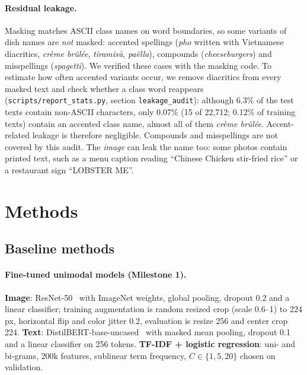 \documentclass[11pt,a4paper]{article}
\begin{document}
\paragraph{Residual leakage.}
Masking matches ASCII class names on word boundaries, so some variants of dish names are \emph{not} masked:
accented spellings (\emph{pho} written with Vietnamese diacritics, \emph{cr\`eme br\^ul\'ee}, \emph{tiramis\`u},
\emph{pa\"ella}), compounds (\emph{cheeseburgers}) and misspellings (\emph{spagetti}). We verified these cases with
the masking code. To estimate how often accented variants occur, we remove diacritics from every masked text and
check whether a class word reappears (\texttt{scripts/report\_stats.py}, section \texttt{leakage\_audit}): although
6.3\% of the test texts contain non-ASCII characters, only 0.07\% (15 of 22,712; 0.12\% of training texts) contain an
accented class name, almost all of them \emph{cr\`eme br\^ul\'ee}. Accent-related leakage is therefore negligible.
Compounds and misspellings are not covered by this audit. The \emph{image} can leak the name too: some photos contain printed text, such as a menu caption
reading ``Chinese Chicken stir-fried rice'' or a restaurant sign ``LOBSTER ME''.

\section{Methods}
\label{sec:methods}

\subsection{Baseline methods}

\paragraph{Fine-tuned unimodal models (Milestone 1).}
\textbf{Image}: ResNet-50~\cite{he2016deep} with ImageNet weights, global pooling, dropout 0.2 and a linear
classifier; training augmentation is random resized crop (scale 0.6--1) to 224 px, horizontal flip and color
jitter 0.2, evaluation is resize 256 and center crop 224. \textbf{Text}: DistilBERT-base-uncased~\cite{sanh2019distilbert}
with masked mean pooling, dropout 0.1 and a linear classifier on 256 tokens. \textbf{TF-IDF + logistic
regression}: uni- and bi-grams, 200k features, sublinear term frequency, $C\in\{1,5,20\}$ chosen on validation.
\end{document}
